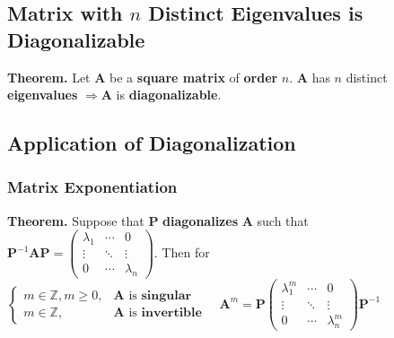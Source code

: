 \documentclass[../ma2001_notes.tex]{subfiles}
\begin{document}
\subsection{Matrix with $n$ Distinct Eigenvalues is Diagonalizable}
\textbf{Theorem.} Let \(\bm{A}\) be a \textbf{square matrix} of \textbf{order} \(n\). \(\bm{A}\) has \(n\) distinct \textbf{eigenvalues} \(\Rightarrow\bm{A}\) is \textbf{diagonalizable}.

\subsection{Application of Diagonalization}
\subsubsection{Matrix Exponentiation}
\textbf{Theorem.} Suppose that \(\bm{P}\) \textbf{diagonalizes} \(\bm{A}\) such that \(\bm{P}^{-1}\bm{AP}=\begin{pmatrix}
	\lambda_1 & \cdots & 0 \\
	\vdots & \ddots & \vdots \\
	0 & \cdots & \lambda_n
\end{pmatrix}\). Then for \(\begin{cases}
	m\in\mathbb{Z},m\geq0, & \bm{A}\text{ is }\textbf{singular} \\
	m\in\mathbb{Z}, & \bm{A}\text{ is }\textbf{invertible}
\end{cases}\quad\bm{A}^m=\bm{P}\begin{pmatrix}
	\lambda_1^m & \cdots & 0 \\
	\vdots & \ddots & \vdots \\
	0 & \cdots & \lambda_n^m
\end{pmatrix}\bm{P}^{-1}\)
\end{document}
